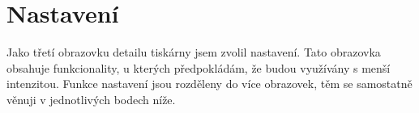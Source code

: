 \section{Nastavení}

Jako třetí obrazovku detailu tiskárny jsem zvolil nastavení.
Tato obrazovka obsahuje funkcionality, u kterých předpokládám, že budou využívány s menší intenzitou.
Funkce nastavení jsou rozděleny do více obrazovek, těm se samostatně věnuji v jednotlivých bodech níže.
